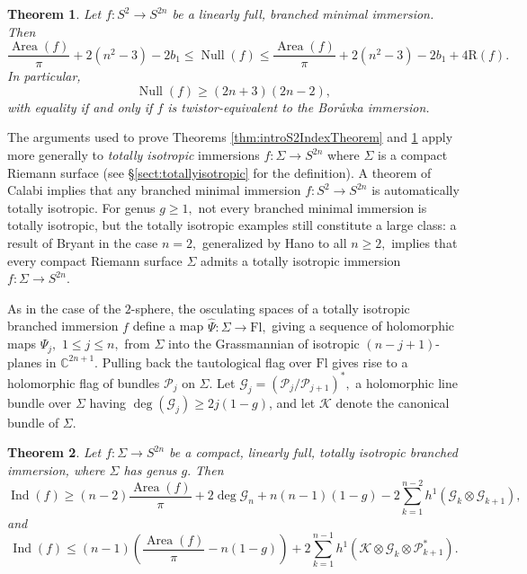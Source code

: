 \documentclass[11pt]{article}
\newtheorem{theorem}{Theorem}[section]
\theoremstyle{definition}
\newcommand{\C}{\mathbb{C}}
\numberwithin{equation}{section}
\begin{document}
\begin{theorem}\label{thm:introS2NullityTheorem}
    Let $f: S^{2} \to S^{2n}$ be a linearly full, branched minimal immersion. Then
    \begin{equation*}
        \frac{\operatorname{Area}(f)}{\pi}+2(n^2 - 3) - 2 b_1 \leq \operatorname{Null}(f) \leq \frac{\operatorname{Area}(f)}{\pi}+2(n^2 - 3) - 2 b_1 + 4 \mathrm{R}(f).
    \end{equation*}
    In particular,
    \begin{equation*}
        \operatorname{Null}(f) \geq (2n+3)(2n-2),
    \end{equation*}
    with equality if and only if $f$ is twistor-equivalent to the Bor\r{u}vka immersion.
\end{theorem}

The arguments used to prove Theorems \ref{thm:introS2IndexTheorem} and \ref{thm:introS2NullityTheorem} apply more generally to \emph{totally isotropic} immersions $f: \Sigma \to S^{2n}$ where $\Sigma$ is a compact Riemann surface (see \S\ref{sect:totallyisotropic} for the definition). A theorem of Calabi \cite{Calabi67} implies that any branched minimal immersion $f : S^2 \to S^{2n}$ is automatically totally isotropic. For genus $g \geq 1,$ not every branched minimal immersion is totally isotropic, but the totally isotropic examples still constitute a large class: a result of Bryant \cite{Bry82} in the case $n=2,$ generalized by Hano \cite{Hano96Immersions} to all $n \geq 2,$ implies that every compact Riemann surface $\Sigma$ admits a totally isotropic immersion $f : \Sigma \to S^{2n}.$

As in the case of the $2$-sphere, the osculating spaces of a totally isotropic branched immersion $f$ define a map $\widehat{\Psi} : \Sigma \to \mathrm{Fl},$ giving a sequence of holomorphic maps $\Psi_j,$ $1 \leq j \leq n,$ from $\Sigma$ into the Grassmannian of isotropic $(n-j+1)$-planes in $\C^{2n+1}.$ Pulling back the tautological flag over $\mathrm{Fl}$ gives rise to a holomorphic flag of bundles $\mathcal{P}_{j}$ on $\Sigma.$ Let $\mathcal{G}_j = (\mathcal{P}_j / \mathcal{P}_{j+1})^*,$ a holomorphic line bundle over $\Sigma$ having $\deg(\mathcal{G}_j) \geq 2j(1-g)$, and let $\mathcal{K}$ denote the canonical bundle of $\Sigma.$

\newpage

\begin{theorem}\label{thm:introgeneralindex}
    Let $f: \Sigma \to S^{2n}$ be a compact, linearly full, totally isotropic branched immersion, where $\Sigma$ has genus $g.$ Then
	\begin{equation*}
		\operatorname{Ind} (f) \geq (n-2) \frac{\operatorname{Area}(f)}{\pi} + 2 \deg \mathcal{G}_n + n(n-1)(1-g) - 2 \sum_{k=1}^{n-2} h^1(\mathcal{G}_k \otimes \mathcal{G}_{k+1}),
	\end{equation*}
    and
    \begin{equation*}
        \operatorname{Ind}(f) \leq (n-1) \left( \frac{\operatorname{Area}(f)}{\pi} - n(1-g) \right) + 2 \sum_{k=1}^{n-1} h^1(\mathcal{K} \otimes \mathcal{G}_k \otimes \mathcal{P}_{k+1}^*).
    \end{equation*}
\end{theorem}
\end{document}
